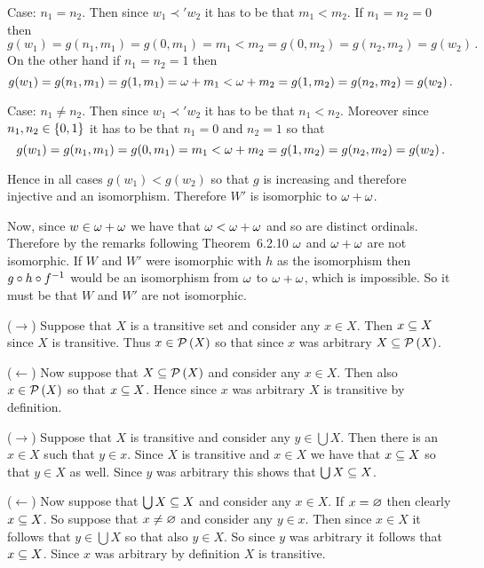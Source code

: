 \begin{solution}
    Case: $n_1 = n_2$.
    Then since $w_1 \prec' w_2$ it has to be that $m_1 < m_2$.
    If $n_1 = n_2 = 0$ then
    $$
    g(w_1) = g(n_1,m_1) = g(0,m_1) = m_1 < m_2 = g(0, m_2) = g(n_2,m_2) = g(w_2) \,.
    $$
    On the other hand if $n_1 = n_2 = 1$ then
    $$
    g(w_1) = g(n_1,m_1) = g(1,m_1) = \w + m_1 < \w + m_2 = g(1, m_2) = g(n_2,m_2) = g(w_2) \,.
    $$

    Case: $n_1 \neq n_2$.
    Then since $w_1 \prec' w_2$ it has to be that $n_1 < n_2$.
    Moreover since $n_1,n_2 \in \braces{0,1}$ it has to be that $n_1 = 0$ and $n_2 = 1$ so that
    $$
    g(w_1) = g(n_1,m_1) = g(0,m_1) = m_1 < \w + m_2 = g(1,m_2) = g(n_2,m_2) = g(w_2) \,.
    $$

    Hence in all cases $g(w_1) < g(w_2)$ so that $g$ is increasing and therefore injective and an isomorphism.
    Therefore $W'$ is isomorphic to $\w + \w$.

    Now, since $w \in \w+\w$ we have that $\w < \w+\w$ and so are distinct ordinals.
    Therefore by the remarks following Theorem~6.2.10 $\w$ and $\w+\w$ are not isomorphic.
    If $W$ and $W'$ were isomorphic with $h$ as the isomorphism then $g \circ h \circ \inv{f}$ would be an isomorphism from $\w$ to $\w + \w$, which is impossible.
    So it must be that $W$ and $W'$ are not isomorphic. \qedsymbol
\end{solution}


\begin{solution}
	($\to$) Suppose that $X$ is a transitive set and consider any $x \in X$.
    Then $x \ss X$ since $X$ is transitive.
    Thus $x \in \pset{X}$ so that since $x$ was arbitrary $X \ss \pset{X}$.

    ($\leftarrow$) Now suppose that $X \ss \pset{X}$ and consider any $x \in X$.
    Then also $x \in \pset{X}$ so that $x \ss X$.
    Hence since $x$ was arbitrary $X$ is transitive by definition. \qedsymbol
\end{solution}


\begin{solution}
    ($\to$) Suppose that $X$ is transitive and consider any $y \in \bigcup X$.
    Then there is an $x \in X$ such that $y \in x$.
    Since $X$ is transitive and $x \in X$ we have that $x \ss X$ so that $y \in X$ as well.
    Since $y$ was arbitrary this shows that $\bigcup X \ss X$.

    ($\leftarrow$) Now suppose that $\bigcup X \ss X$ and consider any $x \in X$.
    If $x = \es$ then clearly $x \ss X$.
    So suppose that $x \neq \es$ and consider any $y \in x$.
    Then since $x \in X$ it follows that $y \in \bigcup X$ so that also $y \in X$.
    So since $y$ was arbitrary it follows that $x \ss X$.
    Since $x$ was arbitrary by definition $X$ is transitive. \qedsymbol
\end{solution}


